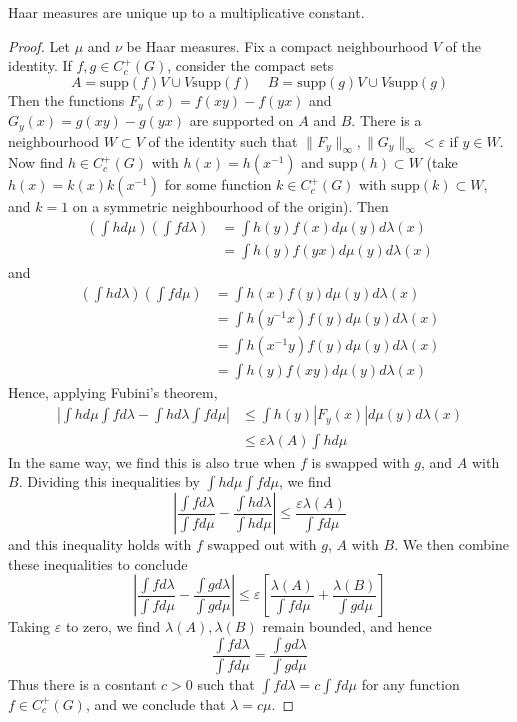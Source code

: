 \begin{theorem}
    Haar measures are unique up to a multiplicative constant.
\end{theorem}
\begin{proof}
    Let $\mu$ and $\nu$ be Haar measures. Fix a compact neighbourhood $V$ of the identity. If $f,g \in C_c^+(G)$, consider the compact sets
    \[ A = \text{supp}(f) V \cup V \text{supp}(f)\ \ \ \ \ B = \text{supp}(g) V \cup V \text{supp}(g) \]
    Then the functions $F_y(x) = f(xy) - f(yx)$ and $G_y(x) = g(xy) - g(yx)$ are supported on $A$ and $B$. There is a neighbourhood $W \subset V$ of the identity such that $\| F_y \|_\infty, \| G_y \|_\infty < \varepsilon$ if $y \in W$. Now find $h \in C_c^+(G)$ with $h(x) = h(x^{-1})$ and $\text{supp}(h) \subset W$ (take $h(x) = k(x) k(x^{-1})$ for some function $k \in C^+_c(G)$ with $\text{supp}(k) \subset W$, and $k = 1$ on a symmetric neighbourhood of the origin). Then
    \begin{align*}
        \left( \int h d\mu \right) \left( \int f d\lambda \right) &= \int h(y) f(x) d\mu(y) d\lambda(x)\\
        &= \int h(y) f(yx) d\mu(y) d\lambda(x)
    \end{align*}
    and
    \begin{align*}
        \left( \int h d\lambda \right) \left( \int f d\mu \right) &= \int h(x) f(y) d\mu(y) d\lambda(x)\\
        &= \int h(y^{-1}x) f(y) d\mu(y) d\lambda(x)\\
        &= \int h(x^{-1}y) f(y) d\mu(y) d\lambda(x)\\
        &= \int h(y) f(xy) d\mu(y) d\lambda(x)
    \end{align*}
    Hence, applying Fubini's theorem,
    \begin{align*}
        \left| \int h d\mu \int f d\lambda - \int h d\lambda \int f d\mu \right| &\leq \int h(y) |F_y(x)| d\mu(y) d\lambda(x)\\
        &\leq \varepsilon \lambda(A) \int h d\mu
    \end{align*}
    In the same way, we find this is also true when $f$ is swapped with $g$, and $A$ with $B$. Dividing this inequalities by $\int h d\mu \int f d\mu$, we find
    \[  \left| \frac{\int f d\lambda}{\int f d\mu} - \frac{\int h d\lambda}{\int h d\mu} \right| \leq \frac{\varepsilon \lambda(A)}{\int f d\mu} \]
    and this inequality holds with $f$ swapped out with $g$, $A$ with $B$. We then combine these inequalities to conclude
    \[ \left| \frac{\int f d\lambda}{\int f d\mu} - \frac{\int g d\lambda}{\int g d\mu} \right| \leq \varepsilon \left[ \frac{\lambda(A)}{\int f d\mu} + \frac{\lambda(B)}{\int g d\mu} \right] \]
    Taking $\varepsilon$ to zero, we find $\lambda(A), \lambda(B)$ remain bounded, and hence
    \[ \frac{\int f d\lambda}{\int f d\mu} = \frac{\int g d\lambda}{\int g d\mu} \]
    Thus there is a cosntant $c > 0$ such that $\int f d\lambda = c \int f d\mu$ for any function $f \in C_c^+(G)$, and we conclude that $\lambda = c \mu$.
\end{proof}

